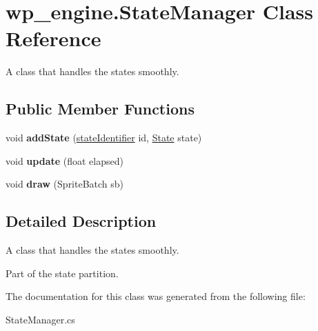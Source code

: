\hypertarget{classwp__engine_1_1_state_manager}{\section{wp\-\_\-engine.\-State\-Manager Class Reference}
\label{classwp__engine_1_1_state_manager}
}


A class that handles the states smoothly.  


\subsection*{Public Member Functions}
\begin{DoxyCompactItemize}
\item 
\hypertarget{classwp__engine_1_1_state_manager_ab3a0b2764d5f7c433ea193d5393a844e}{void {\bfseries add\-State} (\hyperlink{namespacewp__engine_aae123481cdcc6dc4c4474c1b0b62b152}{state\-Identifier} id, \hyperlink{classwp__engine_1_1_state}{State} state)}\label{classwp__engine_1_1_state_manager_ab3a0b2764d5f7c433ea193d5393a844e}

\item 
\hypertarget{classwp__engine_1_1_state_manager_ae14dcdb24376a69456d9bdb78687321b}{void {\bfseries update} (float elapsed)}\label{classwp__engine_1_1_state_manager_ae14dcdb24376a69456d9bdb78687321b}

\item 
\hypertarget{classwp__engine_1_1_state_manager_a5c86e0de0677343b27097ac605a1192c}{void {\bfseries draw} (Sprite\-Batch sb)}\label{classwp__engine_1_1_state_manager_a5c86e0de0677343b27097ac605a1192c}

\end{DoxyCompactItemize}


\subsection{Detailed Description}
A class that handles the states smoothly. 

Part of the state partition. 

The documentation for this class was generated from the following file\-:\begin{DoxyCompactItemize}
\item 
State\-Manager.\-cs\end{DoxyCompactItemize}

